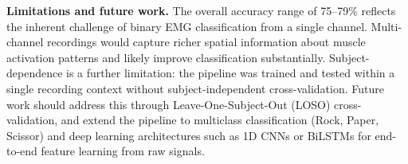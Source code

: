 \textbf{Limitations and future work.}
The overall accuracy range of 75--79\% reflects the inherent challenge of binary EMG
classification from a single channel. Multi-channel recordings would capture richer spatial
information about muscle activation patterns and likely improve classification substantially.
Subject-dependence is a further limitation: the pipeline was trained and tested within a single
recording context without subject-independent cross-validation. Future work should address this
through Leave-One-Subject-Out (LOSO) cross-validation, and extend the pipeline to multiclass
classification (Rock, Paper, Scissor) and deep learning architectures such as 1D CNNs or BiLSTMs
for end-to-end feature learning from raw signals.
